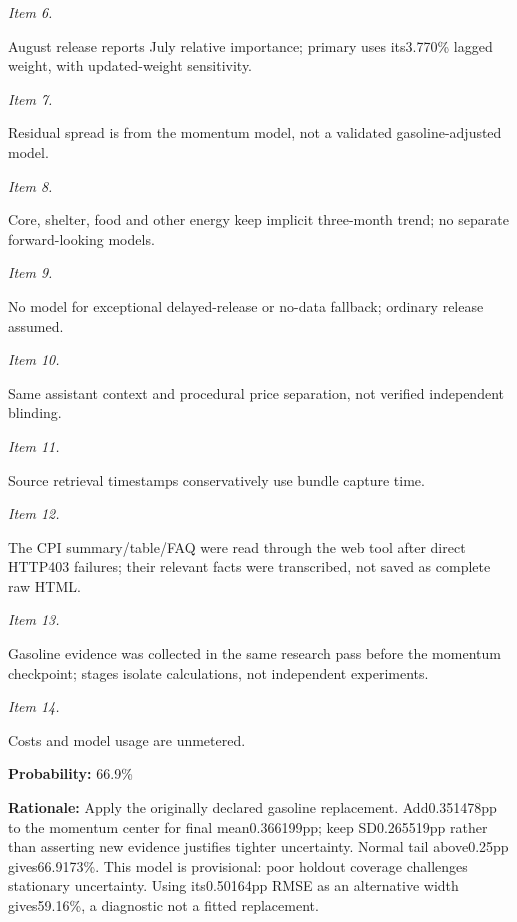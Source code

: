 \documentclass[11pt]{article}
\begin{document}
\par\noindent\textit{Item 6.}\par August release reports July relative importance; primary uses its3.770\% lagged weight, with updated-weight sensitivity.

\par\noindent\textit{Item 7.}\par Residual spread is from the momentum model, not a validated gasoline-adjusted model.

\par\noindent\textit{Item 8.}\par Core, shelter, food and other energy keep implicit three-month trend; no separate forward-looking models.

\par\noindent\textit{Item 9.}\par No model for exceptional delayed-release or no-data fallback; ordinary release assumed.

\par\noindent\textit{Item 10.}\par Same assistant context and procedural price separation, not verified independent blinding.

\par\noindent\textit{Item 11.}\par Source retrieval timestamps conservatively use bundle capture time.

\par\noindent\textit{Item 12.}\par The CPI summary/table/FAQ were read through the web tool after direct HTTP403 failures; their relevant facts were transcribed, not saved as complete raw HTML.

\par\noindent\textit{Item 13.}\par Gasoline evidence was collected in the same research pass before the momentum checkpoint; stages isolate calculations, not independent experiments.

\par\noindent\textit{Item 14.}\par Costs and model usage are unmetered.

\par\noindent\textbf{Probability:} 66.9\%

\par\noindent\textbf{Rationale:} Apply the originally declared gasoline replacement. Add0.351478pp to the momentum center for final mean0.366199pp; keep SD0.265519pp rather than asserting new evidence justifies tighter uncertainty. Normal tail above0.25pp gives66.9173\%. This model is provisional: poor holdout coverage challenges stationary uncertainty. Using its0.50164pp RMSE as an alternative width gives59.16\%, a diagnostic not a fitted replacement.
\end{document}
